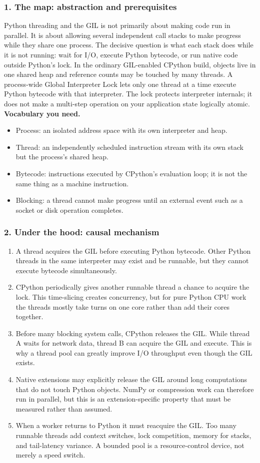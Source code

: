 \subsubsection*{1. The map: abstraction and prerequisites}
Python threading and the GIL is not primarily about making code run in parallel. It is about allowing several independent call stacks to make progress while they share one process. The decisive question is what each stack does while it is not running: wait for I/O, execute Python bytecode, or run native code outside Python's lock.
In the ordinary GIL-enabled CPython build, objects live in one shared heap and reference counts may be touched by many threads. A process-wide Global Interpreter Lock lets only one thread at a time execute Python bytecode with that interpreter. The lock protects interpreter internals; it does not make a multi-step operation on your application state logically atomic.
\textbf{Vocabulary you need.}\begin{itemize}
\item Process: an isolated address space with its own interpreter and heap.
\item Thread: an independently scheduled instruction stream with its own stack but the process's shared heap.
\item Bytecode: instructions executed by CPython's evaluation loop; it is not the same thing as a machine instruction.
\item Blocking: a thread cannot make progress until an external event such as a socket or disk operation completes.
\end{itemize}
\subsubsection*{2. Under the hood: causal mechanism}\begin{enumerate}
\item A thread acquires the GIL before executing Python bytecode. Other Python threads in the same interpreter may exist and be runnable, but they cannot execute bytecode simultaneously.
\item CPython periodically gives another runnable thread a chance to acquire the lock. This time-slicing creates concurrency, but for pure Python CPU work the threads mostly take turns on one core rather than add their cores together.
\item Before many blocking system calls, CPython releases the GIL. While thread A waits for network data, thread B can acquire the GIL and execute. This is why a thread pool can greatly improve I/O throughput even though the GIL exists.
\item Native extensions may explicitly release the GIL around long computations that do not touch Python objects. NumPy or compression work can therefore run in parallel, but this is an extension-specific property that must be measured rather than assumed.
\item When a worker returns to Python it must reacquire the GIL. Too many runnable threads add context switches, lock competition, memory for stacks, and tail-latency variance. A bounded pool is a resource-control device, not merely a speed switch.
\end{enumerate}
